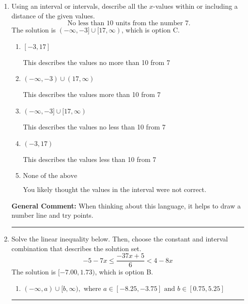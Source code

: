 \documentclass{extbook}[14pt]
\newcommand{\litem}[1]{\item #1

\rule{\textwidth}{0.4pt}}
\begin{document}
\begin{enumerate}
{\begin{enumerate}[label=\Alph*.]
Corresponds to inverting the inequality and negating the solution.
\item \( (-\infty, a) \cup (b, \infty), \text{ where } a \in [-3.82, -2.92] \text{ and } b \in [4.35, 6.3] \)

 * Correct option.
\item \( (-\infty, a] \cup [b, \infty), \text{ where } a \in [-4.35, -2.77] \text{ and } b \in [3.3, 6] \)

Corresponds to including the endpoints (when they should be excluded).
\item \( (-\infty, a] \cup [b, \infty), \text{ where } a \in [-4.72, -3.3] \text{ and } b \in [0.97, 3.3] \)

Corresponds to including the endpoints AND negating.
\item \( (-\infty, \infty) \)

Corresponds to the variable canceling, which does not happen in this instance.
\end{enumerate}

\textbf{General Comment:} When multiplying or dividing by a negative, flip the sign.
}
\litem{
Using an interval or intervals, describe all the $x$-values within or including a distance of the given values.
\[ \text{ No less than } 10 \text{ units from the number } 7. \]The solution is \( (-\infty, -3] \cup [17, \infty) \), which is option C.\begin{enumerate}[label=\Alph*.]
\item \( [-3, 17] \)

This describes the values no more than 10 from 7
\item \( (-\infty, -3) \cup (17, \infty) \)

This describes the values more than 10 from 7
\item \( (-\infty, -3] \cup [17, \infty) \)

This describes the values no less than 10 from 7
\item \( (-3, 17) \)

This describes the values less than 10 from 7
\item \( \text{None of the above} \)

You likely thought the values in the interval were not correct.
\end{enumerate}

\textbf{General Comment:} When thinking about this language, it helps to draw a number line and try points.
}
\litem{
Solve the linear inequality below. Then, choose the constant and interval combination that describes the solution set.
\[ -5 - 7 x \leq \frac{-37 x + 5}{6} < 4 - 8 x \]The solution is \( [-7.00, 1.73) \), which is option B.\begin{enumerate}[label=\Alph*.]
\item \( (-\infty, a) \cup [b, \infty), \text{ where } a \in [-8.25, -3.75] \text{ and } b \in [0.75, 5.25] \)


\end{enumerate}}
\end{enumerate}
\end{document}
